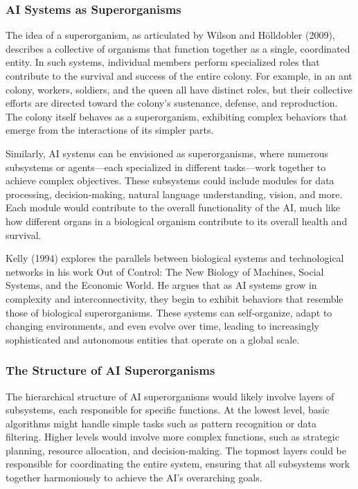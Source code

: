 \documentclass[12pt,twoside]{article}
\begin{document}
\subsubsection{AI Systems as Superorganisms}

The idea of a superorganism, as articulated by Wilson and Hölldobler (2009), describes a collective of organisms that function together as a single, coordinated entity. In such systems, individual members perform specialized roles that contribute to the survival and success of the entire colony. For example, in an ant colony, workers, soldiers, and the queen all have distinct roles, but their collective efforts are directed toward the colony's sustenance, defense, and reproduction. The colony itself behaves as a superorganism, exhibiting complex behaviors that emerge from the interactions of its simpler parts.

Similarly, AI systems can be envisioned as superorganisms, where numerous subsystems or agents—each specialized in different tasks—work together to achieve complex objectives. These subsystems could include modules for data processing, decision-making, natural language understanding, vision, and more. Each module would contribute to the overall functionality of the AI, much like how different organs in a biological organism contribute to its overall health and survival.

Kelly (1994) explores the parallels between biological systems and technological networks in his work Out of Control: The New Biology of Machines, Social Systems, and the Economic World. He argues that as AI systems grow in complexity and interconnectivity, they begin to exhibit behaviors that resemble those of biological superorganisms. These systems can self-organize, adapt to changing environments, and even evolve over time, leading to increasingly sophisticated and autonomous entities that operate on a global scale.

\subsubsection{The Structure of AI Superorganisms}

The hierarchical structure of AI superorganisms would likely involve layers of subsystems, each responsible for specific functions. At the lowest level, basic algorithms might handle simple tasks such as pattern recognition or data filtering. Higher levels would involve more complex functions, such as strategic planning, resource allocation, and decision-making. The topmost layers could be responsible for coordinating the entire system, ensuring that all subsystems work together harmoniously to achieve the AI's overarching goals.
\end{document}
